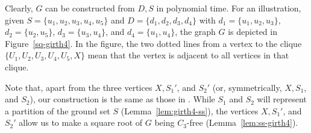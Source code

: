 \documentclass[proceedings]{stacs}
\begin{document}
Clearly, $G$ can be constructed from $D, S$ in polynomial time. For an illustration, given
$S=\{u_1, u_2, u_3, u_4, u_5\}$ and $D=\{d_1, d_2, d_3, d_4\}$ with $d_1=\{u_1,u_2,u_3\}$,
$d_2=\{u_2,u_5\}$, $d_3=\{u_3,u_4\}$, and $d_4=\{u_1,u_4\}$, the graph $G$ is depicted in
Figure~\ref{sq-girth4}. In the figure, the two dotted lines from a vertex to the clique
$\{U_1, U_2, U_3, U_4, U_5, X\}$ mean that the vertex is adjacent to all vertices in that clique.

Note that, apart from the three vertices $X, S_1'$, and $S_2'$ (or, symmetrically, $X, S_1$, and
$S_2$), our construction is the same as those in \cite[\S 3.1.1]{LauCor2004}. While $S_1$ and $S_2$
will represent a partition of the ground set $S$ (Lemma~\ref{lem:girth4-ss}), the vertices $X, S_1'$,
and $S_2'$ allow us to make a square root of $G$ being $C_3$-free (Lemma~\ref{lem:ss-girth4}).
\end{document}
